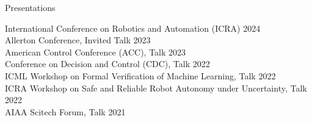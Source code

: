 \begin{rSection}{Presentations}
    
    International Conference on Robotics and Automation (ICRA) \hfill {2024}\\
    Allerton Conference, Invited Talk \hfill {2023}\\
    American Control Conference (ACC), Talk \hfill {2023}\\
    Conference on Decision and Control (CDC), Talk \hfill {2022}\\
    ICML Workshop on Formal Verification of Machine Learning, Talk \hfill {2022}\\
    ICRA Workshop on Safe and Reliable Robot Autonomy under Uncertainty, Talk \hfill {2022}\\
    AIAA Scitech Forum, Talk \hfill {2021}\\

\end{rSection}